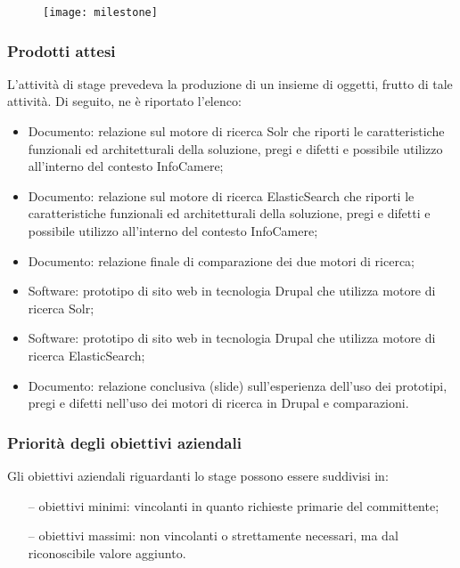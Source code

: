 		\begin{figure}[htbp]
			\begin{center}
				\texttt{[image: milestone]}
			\end{center}
		\end{figure}
	
		\subsubsection{Prodotti attesi}		
		L'attività di stage prevedeva la produzione di un insieme di oggetti, frutto di tale attività. Di seguito, ne è riportato l'elenco:
		
		\begin{itemize}
			\item {Documento: relazione sul motore di ricerca \gls{Solr} che riporti le caratteristiche funzionali ed architetturali della soluzione, pregi e difetti e possibile utilizzo all'interno del contesto InfoCamere;}
			\item {Documento: relazione sul motore di ricerca \gls{ElasticSearch} che riporti le caratteristiche funzionali ed architetturali della soluzione, pregi e difetti e possibile utilizzo all'interno del contesto InfoCamere;}
			\item {Documento: relazione finale di comparazione dei due motori di ricerca;}
			\item {Software: prototipo di sito web in tecnologia \gls{Drupal} che utilizza motore di ricerca \gls{Solr};}
			\item {Software: prototipo di sito web in tecnologia \gls{Drupal} che utilizza motore di ricerca \gls{ElasticSearch};}
			\item {Documento: relazione conclusiva (slide) sull'esperienza dell'uso dei prototipi, pregi e difetti nell'uso dei motori di ricerca in \gls{Drupal} e comparazioni}.
		\end{itemize}

		\subsubsection{Priorità degli obiettivi aziendali}
		\label{subsub:priorita_degli_obiettivi_aziendali}
		Gli obiettivi aziendali riguardanti lo stage possono essere suddivisi in:
		\begin{itemize}
			 \item[--] {obiettivi minimi: vincolanti in quanto richieste primarie del committente;}
			 \item[--] {obiettivi massimi: non vincolanti o strettamente necessari, ma dal riconoscibile valore aggiunto.}
	 	\end{itemize}
 	
